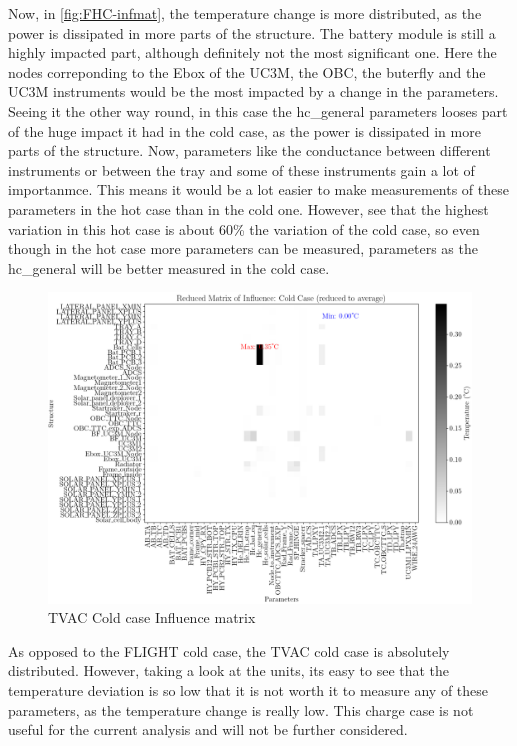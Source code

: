 Now, in \autoref{fig:FHC-infmat}, the temperature change is more distributed, as the power is dissipated in more parts of the structure. The battery module is still a highly impacted part, although definitely not the most significant one. Here the nodes correponding to the Ebox of the UC3M, the OBC, the buterfly and the UC3M instruments would be the most impacted by a change in the parameters. Seeing it the other way round, in this case the hc\_general parameters looses part of the huge impact it had in the cold case, as the power is dissipated in more parts of the structure. Now, parameters like the conductance between different instruments  or between the tray and some of these instruments gain a lot of importanmce. This means it would be a lot easier to make measurements of these parameters in the hot case than in the cold one. However, see that the highest variation in this hot case is about 60\% the variation of the cold case, so even though in the hot case more parameters can be measured, parameters as the hc\_general will be better measured in the cold case.
\begin{figure}[H]
    \centering
    \includegraphics[width = \linewidth]{Figures/UPMSat3/TVAC/infmatCC.png}
    \caption{TVAC Cold case Influence matrix}
    \label{fig:TCC-infmat}
\end{figure}
As opposed to the FLIGHT cold case, the TVAC cold case is absolutely distributed. However, taking a look at the units, its easy to see that the temperature deviation is so low that it is not worth it to measure any of these parameters, as the temperature change is really low. This charge case is not useful for the current analysis and will not be further considered.
